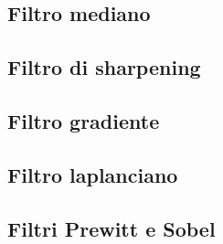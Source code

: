 \documentclass{subfiles}
\begin{document}
\subsection{Filtro mediano}

\clearpage

\subsection{Filtro di sharpening}

\clearpage

\subsection{Filtro gradiente}

\clearpage

\subsection{Filtro laplanciano}

\clearpage

\subsection{Filtri Prewitt e Sobel}

\clearpage
\end{document}
